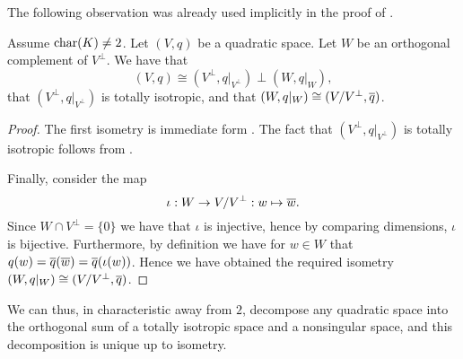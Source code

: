\documentclass[12pt, leqno, british]{amsart}
\begin{document}
The following observation was already used implicitly in the proof of .
\begin{prop}\label{P:decomposition-totally-isotropic}
Assume $\operatorname{char}(K) \neq 2$.
Let $(V, q)$ be a quadratic space.
Let $W$ be an orthogonal complement of $V^\perp$.
We have that $$(V, q) \cong (V^\perp, q\vert_{V^\perp}) \perp (W, q\vert_W),$$ that $(V^\perp, q\vert_{V^\perp})$ is totally isotropic, and that $(W, q\vert_W) \cong (V/V^\perp, \overline{q})$.
\end{prop}
\begin{proof}
The first isometry is immediate form .
The fact that $(V^\perp, q\vert_{V^\perp})$ is totally isotropic follows from .

Finally, consider the map
$$ \iota : W \to V/V^\perp : w \mapsto \overline{w}.$$
Since $W \cap V^\perp = \lbrace 0 \rbrace$ we have that $\iota$ is injective, hence by comparing dimensions, $\iota$ is bijective.
Furthermore, by definition we have for $w \in W$ that $q(w) = \overline{q}(\overline{w}) = \overline{q}(\iota(w))$.
Hence we have obtained the required isometry $(W, q\vert_W) \cong (V/V^\perp, \overline{q})$.
\end{proof}
We can thus, in characteristic away from $2$, decompose any quadratic space into the orthogonal sum of a totally isotropic space and a nonsingular space, and this decomposition is unique up to isometry.
\end{document}
